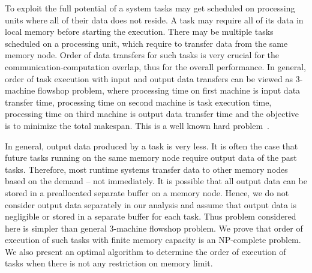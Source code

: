 \documentclass[sigconf]{acmart}
\begin{document}
	To exploit the full potential of a system tasks may get scheduled on processing
	units where all of their data does not reside. A task may require all of its data
	in local memory before starting the execution. There may be multiple tasks
	scheduled on a processing unit, which require to transfer data from the same
	memory node. Order of data transfers for such tasks is very crucial for the
	communication-computation overlap, thus for the overall performance. In general, order of task execution with input and output data transfers can be 
	viewed as 3-machine flowshop problem, where processing time on first machine is 
	input data transfer time, processing time on second machine is task execution time, 
	processing time on third machine is output data transfer time and the objective is 
	to minimize the total makespan. This is a well known hard problem~\cite{NPComplete3Machine,johnson}.
	
	
	In general, output data produced by a task is very less. It is often the case that future tasks running on the same memory node require output data of the past tasks. Therefore, most runtime systems transfer data to other memory nodes based on the demand -- not immediately. It is possible that all output data can be stored in a preallocated separate buffer on a memory node. Hence, we do not consider output data separately in our analysis and assume that output data is negligible or stored in a separate buffer for each task. Thus problem considered here is simpler than general 3-machine flowshop problem. We prove that order of execution of such tasks with finite memory capacity is an NP-complete problem. We also present an optimal algorithm to determine the order of execution of tasks when there is not any restriction on memory limit.
	
	
\end{document}
